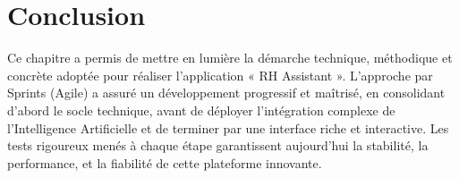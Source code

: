 \section*{Conclusion}
Ce chapitre a permis de mettre en lumière la démarche technique, méthodique et concrète adoptée pour réaliser l'application « RH Assistant ». L'approche par Sprints (Agile) a assuré un développement progressif et maîtrisé, en consolidant d'abord le socle technique, avant de déployer l'intégration complexe de l'Intelligence Artificielle et de terminer par une interface riche et interactive. Les tests rigoureux menés à chaque étape garantissent aujourd'hui la stabilité, la performance, et la fiabilité de cette plateforme innovante.

